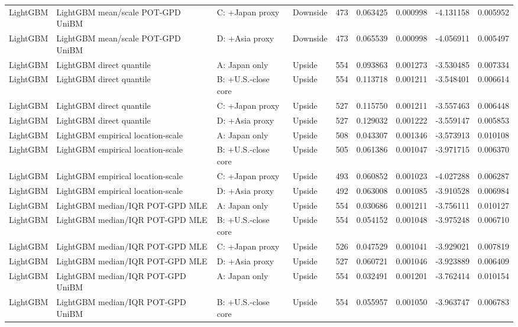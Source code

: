 \begin{tabular}{lll lrrrrr}
LightGBM & LightGBM mean/scale POT-GPD UniBM & C: +Japan proxy & Downside & 473 & 0.063425 & 0.000998 & -4.131158 & 0.005952 \\
LightGBM & LightGBM mean/scale POT-GPD UniBM & D: +Asia proxy & Downside & 473 & 0.065539 & 0.000998 & -4.056911 & 0.005497 \\
LightGBM & LightGBM direct quantile & A: Japan only & Upside & 554 & 0.093863 & 0.001273 & -3.530485 & 0.007334 \\
LightGBM & LightGBM direct quantile & B: +U.S.-close core & Upside & 554 & 0.113718 & 0.001211 & -3.548401 & 0.006614 \\
LightGBM & LightGBM direct quantile & C: +Japan proxy & Upside & 527 & 0.115750 & 0.001211 & -3.557463 & 0.006448 \\
LightGBM & LightGBM direct quantile & D: +Asia proxy & Upside & 527 & 0.129032 & 0.001222 & -3.559147 & 0.005853 \\
LightGBM & LightGBM empirical location-scale & A: Japan only & Upside & 508 & 0.043307 & 0.001346 & -3.573913 & 0.010108 \\
LightGBM & LightGBM empirical location-scale & B: +U.S.-close core & Upside & 505 & 0.061386 & 0.001047 & -3.971715 & 0.006370 \\
LightGBM & LightGBM empirical location-scale & C: +Japan proxy & Upside & 493 & 0.060852 & 0.001023 & -4.027288 & 0.006287 \\
LightGBM & LightGBM empirical location-scale & D: +Asia proxy & Upside & 492 & 0.063008 & 0.001085 & -3.910528 & 0.006984 \\
LightGBM & LightGBM median/IQR POT-GPD MLE & A: Japan only & Upside & 554 & 0.030686 & 0.001211 & -3.756111 & 0.010127 \\
LightGBM & LightGBM median/IQR POT-GPD MLE & B: +U.S.-close core & Upside & 554 & 0.054152 & 0.001048 & -3.975248 & 0.006710 \\
LightGBM & LightGBM median/IQR POT-GPD MLE & C: +Japan proxy & Upside & 526 & 0.047529 & 0.001041 & -3.929021 & 0.007819 \\
LightGBM & LightGBM median/IQR POT-GPD MLE & D: +Asia proxy & Upside & 527 & 0.060721 & 0.001046 & -3.923889 & 0.006409 \\
LightGBM & LightGBM median/IQR POT-GPD UniBM & A: Japan only & Upside & 554 & 0.032491 & 0.001201 & -3.762414 & 0.010154 \\
LightGBM & LightGBM median/IQR POT-GPD UniBM & B: +U.S.-close core & Upside & 554 & 0.055957 & 0.001050 & -3.963747 & 0.006783 \\

\end{tabular}
